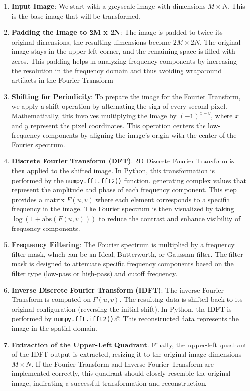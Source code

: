 \documentclass[a4paper,12pt]{article}
\begin{document}
\begin{enumerate}
    \item \textbf{Input Image}:
        We start with a greyscale image with dimensions \( M \times N \). This is the base image that will be transformed.
    \item \textbf{Padding the Image to 2M x 2N}:
        The image is padded to twice its original dimensions, the resulting dimensions become \( 2M \times 2N \). The original image stays in the upper-left corner, and the remaining space is filled with zeros. This padding helps in analyzing frequency components by increasing the resolution in the frequency domain and thus avoiding wraparound artifacts in the Fourier Transform.
    \item \textbf{Shifting for Periodicity}:
        To prepare the image for the Fourier Transform, we apply a shift operation by alternating the sign of every second pixel. Mathematically, this involves multiplying the image by \( (-1)^{x + y} \), where \( x \) and \( y \) represent the pixel coordinates. This operation centers the low-frequency components by aligning the image's origin with the center of the Fourier spectrum.
    \item \textbf{Discrete Fourier Transform (DFT)}:
        2D Discrete Fourier Transform is then applied to the shifted image. In Python, this transformation is performed by the \texttt{numpy.fft.fft2()} function, generating complex values that represent the amplitude and phase of each frequency component. This step provides a matrix \( F(u, v) \) where each element corresponds to a specific frequency in the image. The Fourier spectrum is then visualized by taking \( \log(1 + \text{abs}(F(u, v))) \) to reduce the contrast and enhance visibility of frequency components.
    \item \textbf{Frequency Filtering}:
        The Fourier spectrum is multiplied by a frequency filter mask, which can be an Ideal, Butterworth, or Gaussian filter. The filter mask is designed to attenuate specific frequency components based on the filter type (low-pass or high-pass) and cutoff frequency.
    \item \textbf{Inverse Discrete Fourier Transform (IDFT)}:
        The inverse Fourier Transform is computed on \( F(u, v) \). The resulting data is shifted back to its original configuration (reversing the initial shift). In Python, the IDFT is performed by \texttt{numpy.fft.ifft2()}.@
        This reconstructed data represents the image in the spatial domain.
    \item \textbf{Extraction of the Upper-Left Quadrant}:
        Finally, the upper-left quadrant of the IDFT output is extracted, resizing it to the original image dimensions \( M \times N \). If the Fourier Transform and Inverse Fourier Transform are implemented correctly, this quadrant should closely resemble the original image, indicating a successful transformation and reconstruction.
\end{enumerate}
\end{document}
